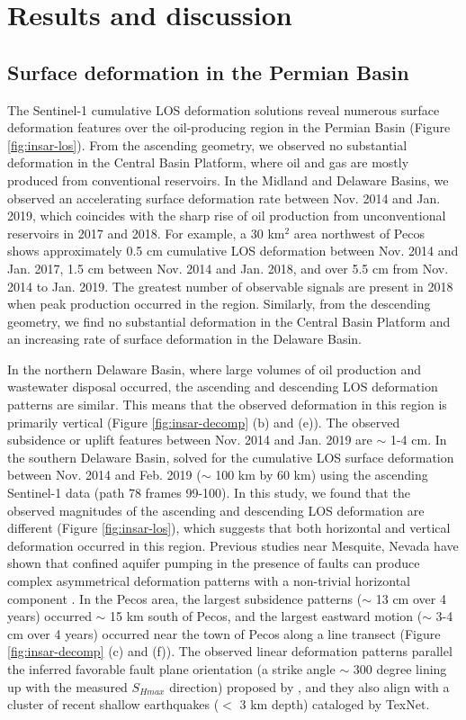 \documentclass[draft]{agujournal2019}
\begin{document}
\section{Results and discussion}
\subsection{Surface deformation in the Permian Basin}
The Sentinel-1 cumulative LOS deformation solutions reveal numerous surface deformation features over the oil-producing region in the Permian Basin (Figure \ref{fig:insar-los}). From the ascending geometry, we observed no substantial deformation in the Central Basin Platform, where oil and gas are mostly produced from conventional reservoirs. In the Midland and Delaware Basins, we observed an accelerating surface deformation rate between Nov. 2014 and Jan. 2019, which coincides with the sharp rise of oil production from unconventional reservoirs in 2017 and 2018. For example, a 30 km$^2 $ area northwest of Pecos shows approximately 0.5 cm cumulative LOS deformation between Nov. 2014 and Jan. 2017, 1.5 cm between Nov. 2014 and Jan. 2018, and over 5.5 cm from Nov. 2014 to Jan. 2019. The greatest number of observable signals are present in 2018 when peak production occurred in the region. Similarly, from the descending geometry, we find no substantial deformation in the Central Basin Platform and an increasing rate of surface deformation in the Delaware Basin. 

In the northern Delaware Basin, where large volumes of oil production and wastewater disposal occurred, the ascending and descending LOS deformation patterns are similar. This means that the observed deformation in this region is primarily vertical (Figure \ref{fig:insar-decomp} (b) and (e)). The observed subsidence or uplift features between Nov. 2014 and Jan. 2019 are $\sim$ 1-4 cm. In the southern Delaware Basin,  solved for the cumulative LOS surface deformation between Nov. 2014 and Feb. 2019 ($\sim$ 100 km by 60 km) using the ascending Sentinel-1 data (path 78 frames 99-100). In this study, we found that the observed magnitudes of the ascending and descending LOS deformation are different (Figure \ref{fig:insar-los}), which suggests that both horizontal and vertical deformation occurred in this region. Previous studies near Mesquite, Nevada have shown that confined aquifer pumping in the presence of faults can produce complex asymmetrical deformation patterns with a non-trivial horizontal component \cite{burbey2008influence}. In the Pecos area, the largest subsidence patterns ($\sim$ 13 cm over 4 years) occurred $\sim$ 15 km south of Pecos, and the largest eastward motion ($\sim$ 3-4 cm over 4 years) occurred near the town of Pecos along a line transect (Figure \ref{fig:insar-decomp} (c) and (f)). The observed linear deformation patterns parallel the inferred favorable fault plane orientation (a strike angle $\sim$ 300 degree lining up with the measured $S_{Hmax}$ direction) proposed by , and they also align with a cluster of recent shallow earthquakes ($<$ 3 km depth) cataloged by TexNet.
\end{document}
